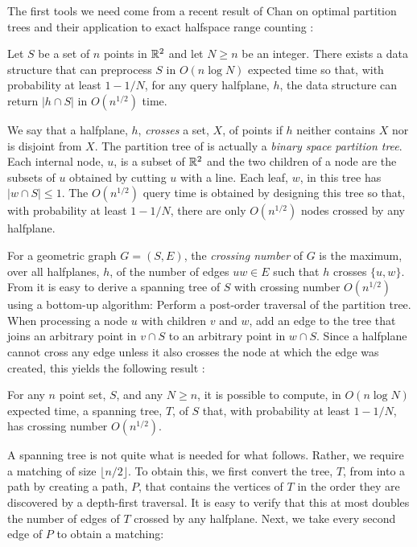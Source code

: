 \documentclass{patmorin}
\begin{document}
The first tools we need come from a recent result of Chan on optimal
partition trees and their application to exact halfspace range counting
\cite[Theorems 3.2 and 5.3, with help from Theorem~5.2]{c12}:

\begin{thm}
  Let $S$ be a set of $n$ points in $\mathbb{R}^2$ and let $N\ge n$ be an integer.
  There exists a data structure that can preprocess $S$ in $O(n\log
  N)$ expected time so that, with probability at least $1-1/N$, for
  any query halfplane, $h$, the data structure can return $|h\cap S|$
  in $O(n^{1/2})$ time.
\end{thm}

We say that a halfplane, $h$, \emph{crosses} a set, $X$, of points if
$h$ neither contains $X$ nor is disjoint from $X$.  The partition tree
of  is actually a \emph{binary space
partition tree}.  Each internal node, $u$, is a subset of $\mathbb{R}^2$ and
the two children of a node are the subsets of $u$ obtained by cutting
$u$ with a line.  Each leaf, $w$, in this tree has $|w\cap S| \le 1$.
The $O(n^{1/2})$ query time is obtained by designing this tree so that,
with probability at least $1-1/N$, there are only $O(n^{1/2})$ nodes
crossed by any halfplane.

For a geometric graph $G=(S,E)$, the \emph{crossing number} of $G$ is the
maximum, over all halfplanes, $h$, of the number of edges $uw\in E$ such
that $h$ crosses $\{u,w\}$.  From  it is
easy to derive a spanning tree of $S$ with crossing number $O(n^{1/2})$
using a bottom-up algorithm:  Perform a post-order traversal of the
partition tree.  When processing a node $u$ with children $v$ and $w$,
add an edge to the tree that joins an arbitrary point in $v\cap S$ to
an arbitrary point in $w\cap S$.  Since a halfplane cannot cross any
edge unless it also crosses the node at which the edge was created,
this yields the following result \cite[Corollary~7.1]{c12}:

\begin{thm}
  For any $n$ point set, $S$, and any $N\ge n$, it is possible to compute,
  in $O(n\log N)$ expected time, a spanning tree, $T$, of $S$ that,
  with probability at least $1-1/N$, has crossing number $O(n^{1/2})$.
\end{thm}

A spanning tree is not quite what is needed for what follows.  Rather,
we require a matching of size $\lfloor n/2\rfloor$.  To obtain this,
we first convert the tree, $T$, from  into a path
by creating a path, $P$, that contains the vertices of $T$ in the order
they are discovered by a depth-first traversal.  It is easy to verify that
this at most doubles the number of edges of $T$ crossed by any halfplane.
Next, we take every second edge of $P$ to obtain a matching:
\end{document}
